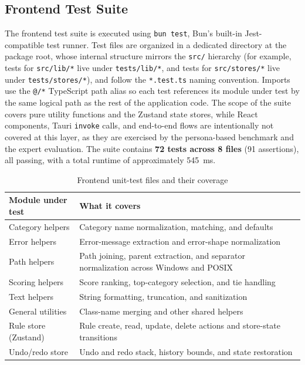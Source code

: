 \documentclass[12pt,oneside,openright,a4paper]{cpe-english-project}
\begin{document}
\subsection{Frontend Test Suite}
The frontend test suite is executed using \texttt{bun test}, Bun's built-in Jest-compatible test runner. Test files are organized in a dedicated directory at the package root, whose internal structure mirrors the \texttt{src/} hierarchy (for example, tests for \texttt{src/lib/*} live under \texttt{tests/lib/*}, and tests for \texttt{src/stores/*} live under \texttt{tests/stores/*}), and follow the \texttt{*.test.ts} naming convention. Imports use the \texttt{@/*} TypeScript path alias so each test references its module under test by the same logical path as the rest of the application code. The scope of the suite covers pure utility functions and the Zustand state stores, while React components, Tauri \texttt{invoke} calls, and end-to-end flows are intentionally not covered at this layer, as they are exercised by the persona-based benchmark and the expert evaluation. The suite contains \textbf{72 tests across 8 files} (91 assertions), all passing, with a total runtime of approximately 545~ms.

\begin{table}[H]
\centering
\caption{Frontend unit-test files and their coverage}
\begin{tabular}{|p{}|p{}|}
\hline
\textbf{Module under test} & \textbf{What it covers} \\
\hline
Category helpers & Category name normalization, matching, and defaults \\
\hline
Error helpers & Error-message extraction and error-shape normalization \\
\hline
Path helpers & Path joining, parent extraction, and separator normalization across Windows and POSIX \\
\hline
Scoring helpers & Score ranking, top-category selection, and tie handling \\
\hline
Text helpers & String formatting, truncation, and sanitization \\
\hline
General utilities & Class-name merging and other shared helpers \\
\hline
Rule store (Zustand) & Rule create, read, update, delete actions and store-state transitions \\
\hline
Undo/redo store & Undo and redo stack, history bounds, and state restoration \\
\hline
\end{tabular}
\end{table}
\end{document}
